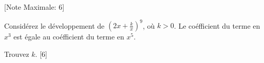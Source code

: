 \begin{question}
  \hspace*{\fill} [Note Maximale: 6]\par
  \medskip
  \noindent Considérez le développement de $\left(2x + \frac{k}{x}\right)^9 $, où $k > 0$. Le coéfficient du terme en $x^3$ est égale au coéfficient du terme en $x^5$.\hspace*{\fill}\par
  \medskip
  \noindent Trouvez $k$.\hspace*{\fill} [6]\par
\end{question}
